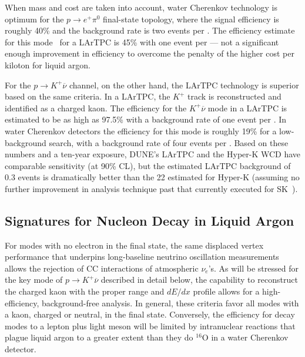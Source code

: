 When mass and cost are taken into account, water Cherenkov technology
is optimum for the $p\to e^+\pi^0$ final-state topology, where the
signal efficiency is roughly 40\% and the background rate is two events
per \SI{}{\Mtyr}.
The efficiency estimate
for this mode~\cite{Bueno:2007um} for a 
LArTPC is 45\% with one event per  \SI{}{\Mtyr} --- not a significant
enough improvement in efficiency to overcome the penalty of the higher
cost per kiloton for liquid argon.

For the $p \rightarrow K^+ \overline{\nu}$ channel, on the other hand, the
LArTPC technology is superior based on the same criteria.  In a
LArTPC, the $K^+$ track is reconstructed and identified as a charged
kaon. The efficiency for the $K^+ \overline{\nu}$ mode in a LArTPC is estimated
to be as high as 97.5\% with a background rate of one event per 
 \SI{}{\Mtyr}. In water Cherenkov detectors the efficiency for this mode is roughly
19\% for a low-background search, with a background rate of four events
per  \SI{}{\Mtyr}.
Based on these numbers and a ten-year exposure, DUNE's 
 LArTPC and the  Hyper-K WCD have comparable
sensitivity (at 90\% CL), but the estimated LArTPC background of 0.3
events is dramatically better than the 22 estimated for Hyper-K 
(assuming no further improvement in analysis technique past that
currently executed for SK~\cite{kearns_isoups}).
 
\subsection{Signatures for Nucleon Decay in Liquid Argon}

For modes with no
electron in the final state, the same displaced vertex performance
that underpins long-baseline neutrino oscillation measurements allows
the rejection of CC interactions of atmospheric $\nu_e$'s.
As will be stressed for the key mode of $p \rightarrow K^+ \overline{\nu}$
described in detail below, the capability to reconstruct the charged
kaon with the proper range and $dE/dx$ profile allows for a high-efficiency,
background-free analysis.  In general, these criteria favor all
modes with a kaon, charged or neutral, in the final state. Conversely,
the efficiency for decay modes to a lepton plus light meson will be
limited by intranuclear reactions that plague liquid argon to a greater extent
than they do $^{\mathrm{16}}$O in a water Cherenkov detector.

